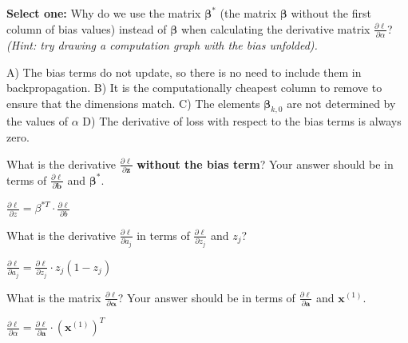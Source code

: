 \documentclass[11pt,addpoints,answers]{exam}
\newcommand{\av}{\mathbf{a}}
\newcommand{\bv}{\mathbf{b}}
\newcommand{\xv}{\mathbf{x}}
\newcommand{\zv}{\mathbf{z}}
\newcommand{\alphav     }{\boldsymbol \alpha     }
\newcommand{\betav      }{\boldsymbol \beta      }
\begin{document}
\begin{questions}
\begin{parts}
\begin{subparts}
    \subpart[1] \textbf{Select one:} Why do we use the matrix $\betav^*$ (the matrix $\betav$ without the first column of bias values) instead of $\betav$ when calculating the derivative matrix $\frac{\partial \ell}{\partial \alpha}$? \textit{(Hint: try drawing a computation graph with the bias unfolded).}
    
    \begin{checkboxes}
        \choice A) The bias terms do not update, so there is no need to include them in backpropagation.
        \choice B) It is the computationally cheapest column to remove to ensure that the dimensions match.
        \CorrectChoice C) The elements $\betav_{k,0}$ are not determined by the values of $\alpha$
        \choice D) The derivative of loss with respect to the bias terms is always zero.
    \end{checkboxes}

    \subpart[1] What is the derivative $\frac{\partial \ell}{\partial \zv}$ \textbf{without the bias term}? Your answer should be in terms of $\frac{\partial \ell}{\partial \bv}$ and $\betav^*$.
    
    \begin{your_solution}[title=$\partial \ell/\partial \zv$,height=6cm,width=15cm]
	$\frac{\partial \ell}{\partial z} = \beta^{*T} \cdot \frac{\partial \ell}{\partial b}$
    \end{your_solution}

    \clearpage

    \subpart[1] What is the derivative $\frac{\partial \ell}{\partial a_j}$ in terms of $\frac{\partial \ell}{\partial z_j}$ and $z_j$?
    
    \begin{your_solution}[title=$\partial \ell/\partial a_j$,height=3cm,width=15cm]
    $\frac{\partial \ell}{\partial a_j} = \frac{\partial \ell}{\partial z_j} \cdot z_j (1 - z_j)$
    \end{your_solution}
    

    \subpart[1] What is the matrix $\frac{\partial \ell}{\partial \boldsymbol{\alpha}}$? Your answer should be in terms of $\frac{\partial \ell}{\partial \av}$ and $\xv^{(1)}$.
    
    \begin{your_solution}[title=$\partial \ell/\partial \alphav$,height=6cm,width=15cm]
    $\frac{\partial \ell}{\partial \alpha} = \frac{\partial \ell}{\partial \mathbf{a}} \cdot (\mathbf{x}^{(1)})^T$
    \end{your_solution}
    

\end{subparts}
\end{parts}
\end{questions}
\end{document}
